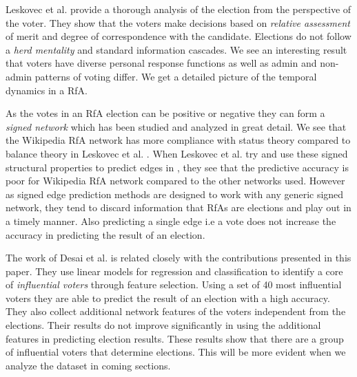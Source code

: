 Leskovec et al. provide a thorough analysis of the election from the perspective of the voter. They show that the voters make decisions based on \textit{relative assessment} of merit and degree of correspondence with the candidate. Elections do not follow a \textit{herd mentality} and standard information cascades. We see an interesting result that voters have diverse personal response functions as well as admin and non-admin patterns of voting differ. \cite{leskovec2010governance} We get a detailed picture of the temporal dynamics in a RfA.
\smallskip

As the votes in an RfA election can be positive or negative they can form a \textit{signed network} which has been studied and analyzed in great detail. We see that the Wikipedia RfA network has more compliance with status theory compared to balance theory in Leskovec et al. \cite{leskovecSigned}. When Leskovec et al. try and use these signed structural properties to predict edges in \cite{leskovecPredicting}, they see that the predictive accuracy is poor for Wikipedia RfA network compared to the other networks used. However as signed edge prediction methods are designed to work with any generic signed network, they tend to discard information that RfAs are elections and play out in a timely manner. Also predicting a single edge i.e a vote does not increase the accuracy in predicting the result of an election.   
\smallskip

The work of Desai et al. \cite{desai2014result} is related closely with the contributions presented in this paper. They use linear models for regression and classification to identify a core of \textit{influential voters} through feature selection. Using a set of 40 most influential voters they are able to predict the result of an election with a high accuracy. They also collect additional network features of the voters independent from the elections. Their results do not improve significantly in using the additional features in predicting election results. These results show that there are a group of influential voters that determine elections. This will be more evident when we analyze the dataset in coming sections.
